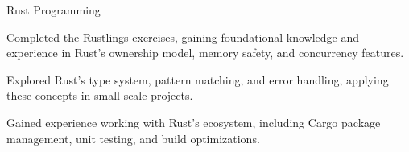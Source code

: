 \begin{cventries}
  \cventry
    {Rust Programming} %
    {} %
    {} %
    {} %
    {
      \begin{cvitems}
        \item {Completed the Rustlings exercises, gaining foundational knowledge and experience in Rust’s ownership model, memory safety, and concurrency features.}
        \item {Explored Rust’s type system, pattern matching, and error handling, applying these concepts in small-scale projects.}
        \item {Gained experience working with Rust’s ecosystem, including Cargo package management, unit testing, and build optimizations.}
      \end{cvitems}
    }


\end{cventries}

